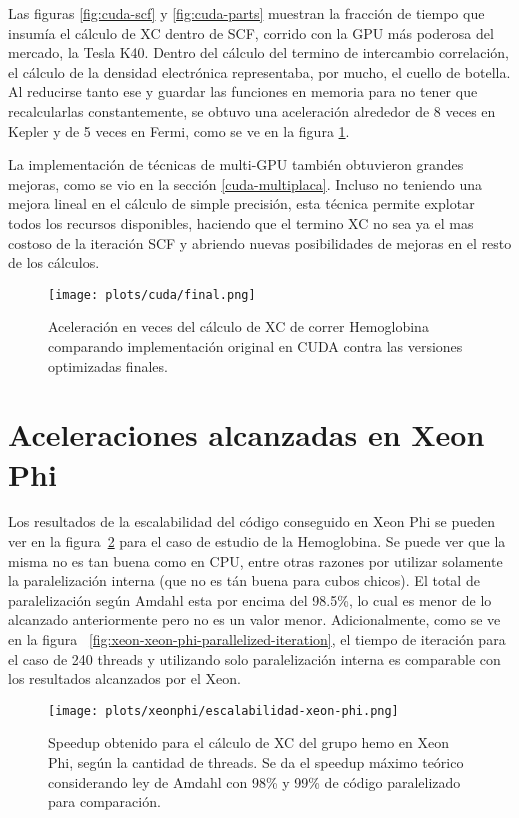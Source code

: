 Las figuras \ref{fig:cuda-scf} y \ref{fig:cuda-parts} muestran la fracci\'on de tiempo que insum\'ia el
c\'alculo de XC dentro de SCF, corrido con la GPU m\'as poderosa del mercado, la \nvidia{} Tesla K40.
Dentro del c\'alculo del termino de intercambio correlaci\'on, el c\'alculo de la densidad electr\'onica
representaba, por mucho, el cuello de botella. Al reducirse tanto ese y guardar las funciones en
memoria para no tener que recalcularlas constantemente, se obtuvo una aceleraci\'on alrededor de 8
veces en Kepler y de 5 veces en Fermi, como se ve en la figura \ref{fig:cuda-final}.

La implementaci\'on de t\'ecnicas de multi-GPU tambi\'en obtuvieron grandes mejoras, como se vio en la
secci\'on \ref{cuda-multiplaca}. Incluso no teniendo una mejora lineal en el c\'alculo de simple
precisi\'on, esta t\'ecnica permite explotar todos los recursos disponibles, haciendo que el termino
XC no sea ya el mas costoso de la iteraci\'on SCF y abriendo nuevas posibilidades de mejoras en el
resto de los c\'alculos.

\begin{figure}[htbp]
   \centering
   \texttt{[image: plots/cuda/final.png]}
   \caption{Aceleraci\'on en veces del c\'alculo de XC de correr Hemoglobina comparando implementaci\'on original en CUDA contra
   las versiones optimizadas finales.}
   \label{fig:cuda-final}
\end{figure}

\section{Aceleraciones alcanzadas en Xeon Phi}

Los resultados de la escalabilidad del c\'odigo conseguido en Xeon Phi se pueden ver
en la figura~\ref{fig:xeon-final-scalability} para el caso de estudio de la Hemoglobina.
Se puede ver que la misma no es tan buena como en CPU, entre otras razones por utilizar
solamente la paralelizaci\'on interna (que no es t\'an buena para cubos chicos). El total de paralelizaci\'on seg\'un
Amdahl esta por encima del 98.5\%, lo cual es menor de lo alcanzado anteriormente
pero no es un valor menor. Adicionalmente, como se ve en la figura
~\ref{fig:xeon-xeon-phi-parallelized-iteration}, el tiempo de iteraci\'on
para el caso de 240 threads y utilizando solo paralelizaci\'on interna es
comparable con los resultados alcanzados por el Xeon.

\begin{figure}[htbp]
   \centering
   \texttt{[image: plots/xeonphi/escalabilidad-xeon-phi.png]}
   \caption{Speedup obtenido para el c\'alculo de XC del grupo hemo en Xeon Phi,
   seg\'un la cantidad de threads. Se da el speedup m\'aximo te\'orico considerando ley de Amdahl
   con 98\% y 99\% de c\'odigo paralelizado para comparaci\'on.}
   \label{fig:xeon-final-scalability}
\end{figure}


